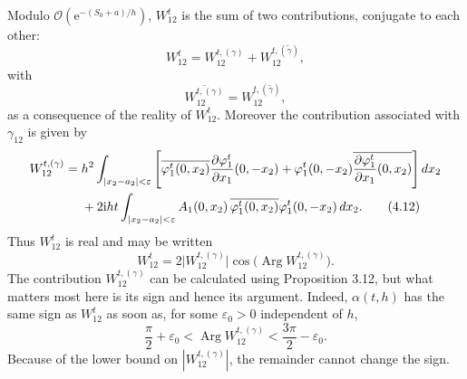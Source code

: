 \documentclass[11pt]{article}
\newcommand{\Argg}{\operatorname{Arg}}
\newcommand{\OO}{\mathcal O}
\newcommand{\dd}{\,d}
\newcommand{\ii}{\mathrm{i}}
\newcommand{\e}{\mathrm{e}}
\begin{document}
Modulo $\OO(\e^{-(S_0+a)/h})$, $W_{12}^t$ is the sum of two contributions, conjugate to each other:
\begin{equation}
W_{12}^t=W_{12}^{t,(\gamma)}+W_{12}^{t,(\widetilde\gamma)},
\tag{4.10}
\end{equation}
with
\begin{equation}
\overline{W_{12}^{t,(\gamma)}}=W_{12}^{t,(\widetilde\gamma)},
\tag{4.11}
\end{equation}
as a consequence of the reality of $W_{12}^t$. Moreover the contribution associated with $\gamma_{12}$ is given by
\begin{align}
W_{12}^{t,(\gamma)}
={}&h^2\int_{|x_2-a_2|<\varepsilon}
\Bigg[
\overline{\varphi_1^t(0,x_2)}
\frac{\partial\varphi_1^t}{\partial x_1}(0,-x_2)
+\varphi_1^t(0,-x_2)
\overline{\frac{\partial\varphi_1^t}{\partial x_1}(0,x_2)}
\Bigg]\dd x_2\notag\\
&+2\ii h t\int_{|x_2-a_2|<\varepsilon}
A_1(0,x_2)\,
\overline{\varphi_1^t(0,x_2)}\varphi_1^t(0,-x_2)\dd x_2.
\tag{4.12}
\end{align}
Thus $W_{12}^t$ is real and may be written
\begin{equation}
W_{12}^t
=2\bigl|W_{12}^{t,(\gamma)}\bigr|
\cos\bigl(\Argg W_{12}^{t,(\gamma)}\bigr).
\tag{4.13}
\end{equation}
The contribution $W_{12}^{t,(\gamma)}$ can be calculated using Proposition 3.12, but what matters most here is its sign and hence its argument. Indeed, $\alpha(t,h)$ has the same sign as $W_{12}^t$ as soon as, for some $\varepsilon_0>0$ independent of $h$,
\[
\frac{\pi}{2}+\varepsilon_0
<\Argg W_{12}^{t,(\gamma)}
<\frac{3\pi}{2}-\varepsilon_0.
\]
Because of the lower bound on $|W_{12}^{t,(\gamma)}|$, the remainder cannot change the sign.
\end{document}
